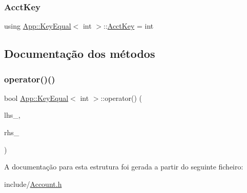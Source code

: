 \subsubsection{\texorpdfstring{Acct\+Key}{AcctKey}}
{\footnotesize\ttfamily using \hyperlink{structApp_1_1KeyEqual}{App\+::\+Key\+Equal}$<$ int $>$\+::\hyperlink{structApp_1_1KeyEqual_3_01int_01_4_a118d7cd5a24685872ff596df5de9fcba}{Acct\+Key} =  int}



\subsection{Documentação dos métodos}
\mbox{\label{structApp_1_1KeyEqual_3_01int_01_4_a7cf92625e2022798c20a8e781c1765e8}} 
\subsubsection{\texorpdfstring{operator()()}{operator()()}}
{\footnotesize\ttfamily bool \hyperlink{structApp_1_1KeyEqual}{App\+::\+Key\+Equal}$<$ int $>$\+::operator() (\begin{DoxyParamCaption}\item[{const \hyperlink{structApp_1_1KeyEqual_3_01int_01_4_a118d7cd5a24685872ff596df5de9fcba}{Acct\+Key} \&}]{lhs\+\_\+,  }\item[{const \hyperlink{structApp_1_1KeyEqual_3_01int_01_4_a118d7cd5a24685872ff596df5de9fcba}{Acct\+Key} \&}]{rhs\+\_\+ }\end{DoxyParamCaption})\hspace{0.3cm}{\ttfamily [inline]}}



A documentação para esta estrutura foi gerada a partir do seguinte ficheiro\+:\begin{DoxyCompactItemize}
\item 
include/\hyperlink{Account_8h}{Account.\+h}\end{DoxyCompactItemize}
